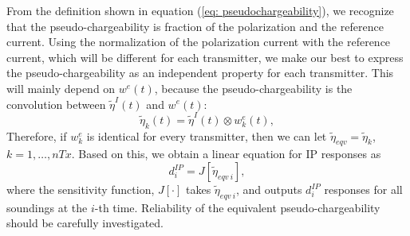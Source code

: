 \documentclass[a4paper, 11pt]{article}
\newcommand{\peta}{\tilde{\eta}}
\newcommand{\dip}{d^{IP}}
\begin{document}
From the definition shown in equation (\ref{eq: pseudochargeability}), we recognize that the pseudo-chargeability is fraction of the polarization and the reference current. 
Using the normalization of the polarization current with the reference current, which will be different for each transmitter, we make our best to express the pseudo-chargeability as an independent property for each transmitter. 
This will mainly depend on $w^e(t)$, because the pseudo-chargeability is the convolution between $\peta^{I}(t)$ and $w^e(t)$:
\begin{equation}
  \peta_k(t) = \peta^{I}(t) \otimes w^e_k(t),
  \label{eq: pseudochargeability_petaI}
\end{equation}
Therefore, if $w^e_k$ is identical for every transmitter, then we can let $\peta_{eqv} = \peta_k$, $k=1, \ldots, nTx$. 
Based on this, we obtain a linear equation for IP responses as
\begin{equation}
  \dip_i =J[\peta_{eqv \ i}],
  \label{eq: pseudochargeability_equivalent}
\end{equation}
where the sensitivity function, $J[\cdot]$ takes $\peta_{eqv \ i}$, and outputs $\dip_i$ responses for all soundings at the $i$-th time. 
Reliability of the equivalent pseudo-chargeability should be carefully investigated. 

\end{document}
